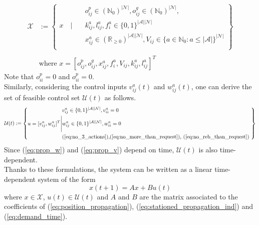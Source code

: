 \begin{equation}
	\begin{aligned}
	\mathcal{X} &:= \left\{
	\begin{aligned}
		& o^p_{ij} \in (\mathbb{N}_0)^{|\mathcal{N}|}, o^g_{ij} \in (\mathbb{N}_0)^{|\mathcal{N}|}, \\
		 x \quad \Bigg| \quad&k^a_{ij}, l^a_{ij},f^a_{i} \in \{0,1\}^{|\mathcal{A}||\mathcal{N}|} \\%
		& x_{ij}^a\in (\mathbb{R}_{\ge 0})^{|\mathcal{A}||\mathcal{N}|}, V_{ij} \in \{ a \in \mathbb{N}_0 : a \leq |\mathcal{A}| \}^{|\mathcal{N}|}\\%
	\end{aligned}
	\right\}\\
	&\\
	&\text{where } x = [o^p_{ij},o^g_{ij}, x_{ij}^a, f^a_{i}, V_{ij} , k^a_{ij}, l^a_{ij}]^T
\end{aligned}
\end{equation}
Note that $o^p_{ii} = 0$ and $o^p_{ii} = 0$. \\
Similarly, considering the control inputs $v^{a}_{ij}(t)$ and $w^{a}_{ij}(t)$, one can derive the set of feasible control set $\mathcal{U}(t)$ as follows. 
\begin{equation}
	\mathcal{\mathcal{U}}(t) := \left\{
	\begin{aligned}
		&v^a_{ij} \in \{0,1\}^{|\mathcal{A}||\mathcal{N}|}, v^a_{ii} = 0 \\
		u = [v^{a}_{ij}, w^{a}_{ij}]^T \Bigg|&w^a_{ij} \in \{0,1\}^{|\mathcal{A}||\mathcal{N}|},w^a_{ii} = 0 \\ 
		& \text{(\ref{eq:no_3_actions}),\text{(\ref{eq:no_more_than_request})}, \text{(\ref{eq:no_reb_than_request})}
		} \\
	\end{aligned}
	\right\}
\end{equation}
Since (\ref{eq:prop_w}) and (\ref{eq:prop_v}) depend on time, $\mathcal{U}(t)$ is also time-dependent. \\
Thanks to these formulations, the system can be written as a linear time-dependent system of the form
\begin{equation}
	x(t+1) = Ax + Bu(t)\label{eq:normal_system}
\end{equation}
where $x \in \mathcal{X}$, $u(t) \in \mathcal{U}(t)$ and $A$ and $B$ are the matrix associated to the coefficients of (\ref{eq:position_propagation}), (\ref{eq:stationed_propagation_ind}) and (\ref{eq:demand_time}). \\
